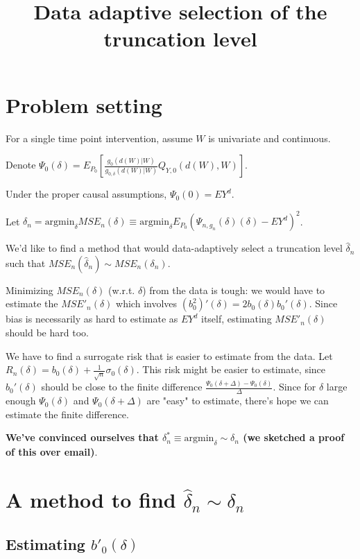 \documentclass[a4paper]{article}
\title{Data adaptive selection of the truncation level}
\begin{document}
\maketitle

\section{Problem setting}

For a single time point intervention, assume $W$ is univariate and continuous.

Denote $\Psi_0(\delta) = E_{P_0}\left[\frac{g_0(d(W)|W)}{g_{0, \delta}(d(W)|W)}Q_{Y,0}(d(W), W)\right]$.
 
Under the proper causal assumptions, $\Psi_0(0) = EY^d$.

Let $\delta_n = \text{argmin}_\delta MSE_n(\delta) \equiv \text{argmin}_\delta E_{P_0} \left(\Psi_{n, g_n}(\delta)(\delta) - EY^d\right)^2$.


We'd like to find a method that would data-adaptively select a truncation level $\hat{\delta}_n$ such that $MSE_n(\hat{\delta}_n) \sim MSE_n(\delta_n)$.

Minimizing $MSE_n(\delta)$ (w.r.t. $\delta$) from the data is tough: we would have to estimate the $MSE'_n(\delta)$ which involves $(b_0^2)'(\delta) = 2  b_0(\delta) b_0'(\delta)$. Since bias is necessarily as hard to estimate as $EY^d$ itself, estimating $MSE'_n(\delta)$ should be hard too.

We have to find a surrogate risk that is easier to estimate from the data. Let $R_n(\delta) = b_0(\delta) + \frac{1}{\sqrt{n}} \sigma_0(\delta)$. This risk might be easier to estimate, since $b_0'(\delta)$ should be close to the finite difference $\frac{\Psi_0(\delta + \Delta) - \Psi_0(\delta)}{\Delta}$. Since for $\delta$ large enough $\Psi_0(\delta)$ and $\Psi_0(\delta + \Delta)$ are "easy" to estimate, there's hope we can estimate the finite difference.

\textbf{We've convinced ourselves that  $\delta_n^* \equiv \text{argmin}_\delta \sim \delta_n$ (we sketched a proof of this over email)}.

\medskip

\section{A method to find $\hat{\delta}_n \sim \delta_n$}

\subsection{Estimating $b'_0(\delta)$}
\end{document}
